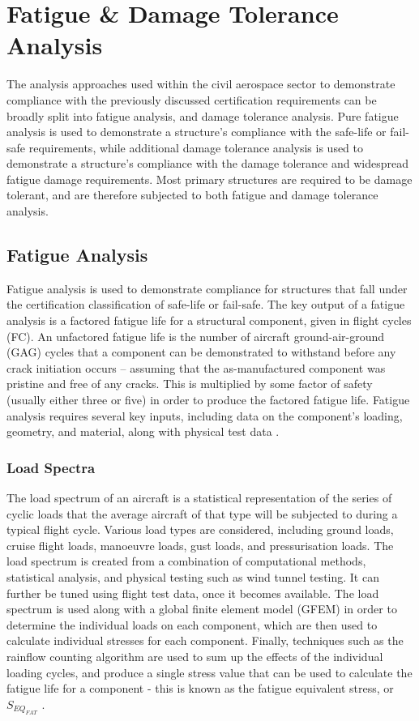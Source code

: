 \newpage
\section{Fatigue \& Damage Tolerance Analysis}\label{sec:fdt_analysis}

The analysis approaches used within the civil aerospace sector to demonstrate compliance with the previously discussed certification requirements can be broadly split into fatigue analysis, and damage tolerance analysis. Pure fatigue analysis is used to demonstrate a structure's compliance with the safe-life or fail-safe requirements, while additional damage tolerance analysis is used to demonstrate a structure's compliance with the damage tolerance and widespread fatigue damage requirements. Most primary structures are required to be damage tolerant, and are therefore subjected to both fatigue and damage tolerance analysis.

\subsection{Fatigue Analysis}

Fatigue analysis is used to demonstrate compliance for structures that fall under the certification classification of safe-life or fail-safe. The key output of a fatigue analysis is a factored fatigue life for a structural component, given in flight cycles (FC). An unfactored fatigue life is the number of aircraft ground-air-ground (GAG) cycles that a component can be demonstrated to withstand before any crack initiation occurs -- assuming that the as-manufactured component was pristine and free of any cracks. This is multiplied by some factor of safety (usually either three or five) in order to produce the factored fatigue life. Fatigue analysis requires several key inputs, including data on the component's loading, geometry, and material, along with physical test data \cite{schijve_load_2009}.

\subsubsection{Load Spectra}\label{sec:load_spectra}

The load spectrum of an aircraft is a statistical representation of the series of cyclic loads that the average aircraft of that type will be subjected to during a typical flight cycle. Various load types are considered, including ground loads, cruise flight loads, manoeuvre loads, gust loads, and pressurisation loads. The load spectrum is created from a combination of computational methods, statistical analysis, and physical testing such as wind tunnel testing. It can further be tuned using flight test data, once it becomes available. The load spectrum is used along with a global finite element model (GFEM) in order to determine the individual loads on each component, which are then used to calculate individual stresses for each component. Finally, techniques such as the rainflow counting algorithm are used to sum up the effects of the individual loading cycles, and produce a single stress value that can be used to calculate the fatigue life for a component {-} this is known as the fatigue equivalent stress, or $S_{EQ_{FAT}}$ \cite{schijve_load_2009}.

